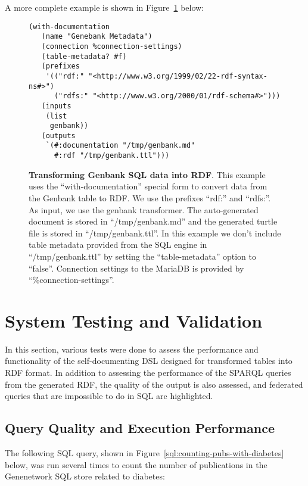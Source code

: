 A more complete example is shown in Figure~\ref{code:with-documentation-example} below:

\begin{figure}[H]
\centering
\begin{verbatim}
(with-documentation
   (name "Genebank Metadata")
   (connection %connection-settings)
   (table-metadata? #f)
   (prefixes
    '(("rdf:" "<http://www.w3.org/1999/02/22-rdf-syntax-ns#>")
      ("rdfs:" "<http://www.w3.org/2000/01/rdf-schema#>")))
   (inputs
    (list
     genbank))
   (outputs
    `(#:documentation "/tmp/genbank.md"
      #:rdf "/tmp/genbank.ttl")))
\end{verbatim}
\caption[Transforming Genbank SQL data into RDF using \textit{``with-documentation''} special form]{\textbf{Transforming Genbank SQL data into RDF}.  This example uses the ``with-documentation'' special form to convert data from the Genbank table to RDF.  We use the prefixes ``rdf:'' and ``rdfs:''.  As input, we use the genbank transformer.  The auto-generated document is stored in ``/tmp/genbank.md'' and the generated turtle file is stored in ``/tmp/genbank.ttl''.  In this example we don't include table metadata provided from the SQL engine in ``/tmp/genbank.ttl'' by setting the ``table-metadata'' option to ``false''.  Connection settings to the MariaDB is provided by ``\%connection-settings''.}\label{code:with-documentation-example}
\end{figure}

\section{System Testing and Validation}

In this section, various tests were done to assess the performance and functionality of the self-documenting DSL designed for transformed tables into RDF format.  In addition to assessing the performance of the SPARQL queries from the generated RDF, the quality of the output is also assessed, and federated queries that are impossible to do in SQL are highlighted.

\subsection{Query Quality and Execution Performance}

The following SQL query, shown in Figure~\ref{sql:counting-pubs-with-diabetes} below, was run several times to count the number of publications in the Genenetwork SQL store related to diabetes:


